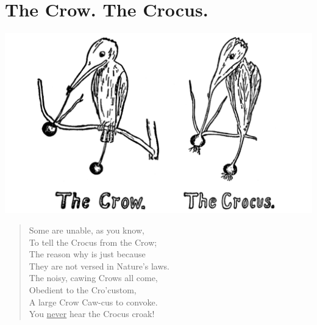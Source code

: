 \documentclass[letterpaper, 10pt, openany]{memoir}
\begin{document}
\chapter{The Crow. The Crocus.}
\includegraphics[width=1\textwidth]{f-p03.png}
\vspace{\onelineskip}
\begin{verse}\huge
Some are unable, as you know,\\
To tell the Crocus from the Crow;\\
The reason why is just because\\
They are not versed in Nature's laws.\\
The noisy, cawing Crows all come,\\
Obedient to the Cro'custom,\\
A large Crow Caw-cus to convoke.\\
You \underline{never} hear the Crocus croak!\\
\end{verse}
\vspace{\onelineskip}
\end{document}
